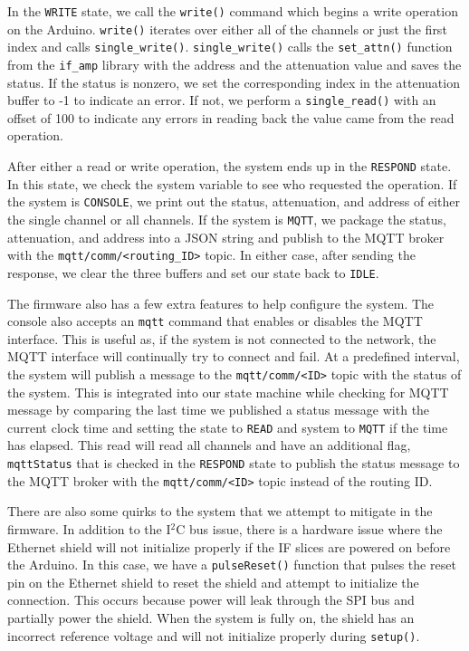 In the \texttt{WRITE} state, we call the \texttt{write()} command which begins a write operation on the Arduino.
\texttt{write()} iterates over either all of the channels or just the first index and calls \texttt{single\_write()}.
\texttt{single\_write()} calls the \texttt{set\_attn()} function from the \texttt{if\_amp} library with the address and the attenuation value and saves the status. 
If the status is nonzero, we set the corresponding index in the attenuation buffer to -1 to indicate an error.
If not, we perform a \texttt{single\_read()} with an offset of 100 to indicate any errors in reading back the value came from the read operation. 

After either a read or write operation, the system ends up in the \texttt{RESPOND} state.
In this state, we check the system variable to see who requested the operation.
If the system is \texttt{CONSOLE}, we print out the status, attenuation, and address of either the single channel or all channels.
If the system is \texttt{MQTT}, we package the status, attenuation, and address into a JSON string and publish to the MQTT broker with the \texttt{mqtt/comm/<routing\_ID>} topic.
In either case, after sending the response, we clear the three buffers and set our state back to \texttt{IDLE}.

The firmware also has a few extra features to help configure the system.
The console also accepts an \texttt{mqtt} command that enables or disables the MQTT interface.
This is useful as, if the system is not connected to the network, the MQTT interface will continually try to connect and fail.
At a predefined interval, the system will publish a message to the \texttt{mqtt/comm/<ID>} topic with the status of the system.
This is integrated into our state machine while checking for MQTT message by comparing the last time we published a status message with the current clock time and setting the state to \texttt{READ} and system to \texttt{MQTT} if the time has elapsed.
This read will read all channels and have an additional flag, \texttt{mqttStatus} that is checked in the \texttt{RESPOND} state to publish the status message to the MQTT broker with the \texttt{mqtt/comm/<ID>} topic instead of the routing ID.

There are also some quirks to the system that we attempt to mitigate in the firmware.
In addition to the I$^2$C bus issue, there is a hardware issue where the Ethernet shield will not initialize properly if the IF slices are powered on before the Arduino. 
In this case, we have a \texttt{pulseReset()} function that pulses the reset pin on the Ethernet shield to reset the shield and attempt to initialize the connection.
This occurs because power will leak through the SPI bus and partially power the shield.
When the system is fully on, the shield has an incorrect reference voltage and will not initialize properly during \texttt{setup()}.

